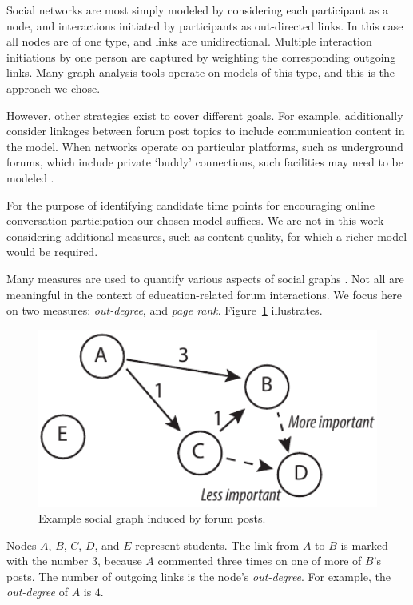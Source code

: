Social networks are most simply modeled by considering each
participant as a node, and interactions initiated by participants as
out-directed links. In this case all nodes are of one type, and links
are unidirectional. Multiple interaction initiations by one person are
captured by weighting the corresponding outgoing links. Many graph
analysis tools operate on models of this type, and this is the
approach we chose.

However, other strategies exist to cover different goals. For example,
\cite{Anwar2013} additionally consider linkages between forum post
topics to include communication content in the model. When networks
operate on particular platforms, such as underground forums, which
include private `buddy' connections, such facilities may need to be
modeled \cite{Moto2011}.

For the purpose of identifying candidate time points for encouraging
online conversation participation our chosen model suffices. We are
not in this work considering additional measures, such as content
quality, for which a richer model would be required.

Many measures are used to quantify various aspects of social graphs
\cite{hann2005, lesk14}. Not all are meaningful in the context of
education-related forum interactions. We focus here on two measures:
{\em out-degree}, and {\em page rank}. Figure~\ref{fig:graphExpl}
illustrates.

\begin{figure}[htp]
       \centering
       \includegraphics[width=1.0\textwidth]{Figs/forumNetworkExample.pdf}
       \caption{\textnormal{Example social graph induced by forum posts.}}
       \label{fig:graphExpl}
\end{figure}

Nodes $A$, $B$, $C$, $D$, and $E$ represent students. The link from
$A$ to $B$ is marked with the number $3$, because $A$ commented three
times on one of more of $B$'s posts. The number of outgoing links is
the node's {\em out-degree}. For example, the {\em out-degree} of $A$
is $4$.

